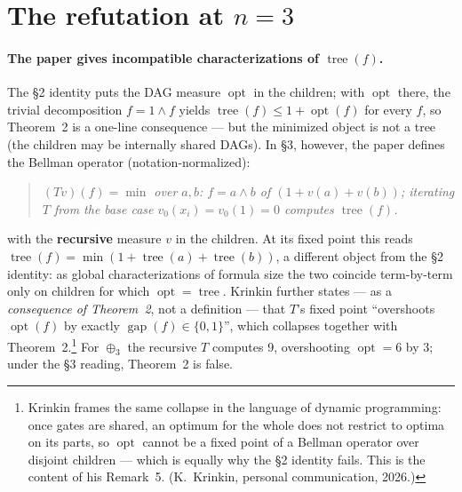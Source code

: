 \documentclass[11pt]{article}
\DeclareMathOperator{\opt}{opt}
\DeclareMathOperator{\tree}{tree}
\DeclareMathOperator{\gapop}{gap}
\theoremstyle{plain}
\begin{document}
\section{The refutation at \texorpdfstring{$n = 3$}{n = 3}}
\label{sec:refutation}

\paragraph{The paper gives incompatible characterizations of $\tree(f)$.} The \S2 identity puts the
DAG measure $\opt$ in the children; with $\opt$ there, the trivial decomposition $f = 1 \wedge f$
yields $\tree(f) \le 1 + \opt(f)$ for every $f$, so Theorem~2 is a one-line consequence --- but the
minimized object is not a tree (the children may be internally shared DAGs). In \S3, however, the
paper defines the Bellman operator (notation-normalized):

\begin{quote}
\itshape
$(Tv)(f) = \min$ over $a,b$: $f = a \wedge b$ of $(1 + v(a) + v(b))$; iterating $T$ from the base
case $v_0(x_i) = v_0(1) = 0$ computes $\tree(f)$.
\end{quote}

with the \textbf{recursive} measure $v$ in the children. At its fixed point this reads
$\tree(f) = \min(1 + \tree(a) + \tree(b))$, a different object from the \S2 identity: as global
characterizations of formula size the two coincide term-by-term only on children for which
$\opt = \tree$. Krinkin further states --- as a \emph{consequence of Theorem~2}, not a definition ---
that $T$'s fixed point ``overshoots $\opt(f)$ by exactly $\gapop(f) \in \{0,1\}$'', which collapses
together with Theorem~2.\footnote{Krinkin frames the same collapse in the language of dynamic
programming: once gates are shared, an optimum for the whole does not restrict to optima on its
parts, so $\opt$ cannot be a fixed point of a Bellman operator over disjoint children --- which
is equally why the \S2 identity fails. This is the content of his Remark~5. (K.\ Krinkin,
personal communication, 2026.)} For $\oplus_3$ the recursive $T$ computes 9, overshooting $\opt = 6$ by 3;
under the \S3 reading, Theorem~2 is false.
\end{document}
